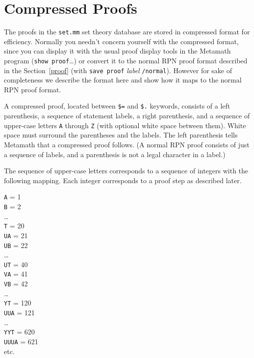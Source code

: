 \chapter{Compressed Proofs}
\label{compressed}

The proofs in the \texttt{set.mm} set theory database are stored in compressed
format for efficiency.  Normally you needn't concern yourself with the
compressed format, since you can display it with the usual proof display tools
in the Metamath program (\texttt{show proof}\ldots) or convert it to the normal
RPN proof format described in the Section~\ref{proof} (with \texttt{save proof}
{\em label} \texttt{/normal}).  However for sake of completeness we describe the
format here and show how it maps to the normal RPN proof format.

A compressed proof, located between \texttt{\$=} and \texttt{\$.} keywords, consists
of a left parenthesis, a sequence of statement labels, a right parenthesis,
and a sequence of upper-case letters \texttt{A} through \texttt{Z} (with optional
white space between them).  White space must surround the parentheses
and the labels.  The left parenthesis tells Metamath that a
compressed proof follows.  (A normal RPN proof consists of just a sequence of
labels, and a parenthesis is not a legal character in a label.)

The sequence of upper-case letters corresponds to a sequence of integers
with the following mapping.  Each integer corresponds to a proof step as
described later.
\begin{center}
  \texttt{A} = 1 \\
  \texttt{B} = 2 \\
   \ldots \\
  \texttt{T} = 20 \\
  \texttt{UA} = 21 \\
  \texttt{UB} = 22 \\
   \ldots \\
  \texttt{UT} = 40 \\
  \texttt{VA} = 41 \\
  \texttt{VB} = 42 \\
   \ldots \\
  \texttt{YT} = 120 \\
  \texttt{UUA} = 121 \\
   \ldots \\
  \texttt{YYT} = 620 \\
  \texttt{UUUA} = 621 \\
   etc.
\end{center}

